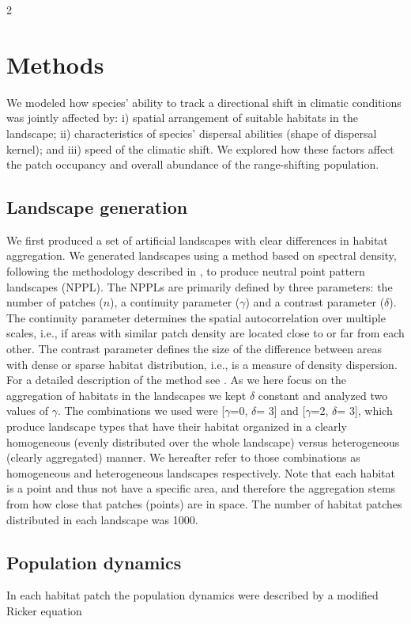 \documentclass[12pt,pdftex]{article}
\begin{document}
\begin{spacing}{2}
\section*{Methods}

We modeled how species' ability to track a directional shift in climatic conditions was jointly affected by: i) spatial arrangement of suitable habitats in the landscape; ii) characteristics of species' dispersal abilities (shape of dispersal kernel); and iii) speed of the climatic shift. We explored how these factors affect the patch occupancy and overall abundance of the range-shifting population.

\subsection*{Landscape generation}			
We first produced a set of artificial landscapes with clear differences in habitat aggregation. We generated landscapes using a method based on spectral density, following the methodology described in \cite{Lindstrom2011}, to produce neutral point pattern landscapes (NPPL). The NPPLs are primarily defined by three parameters: the number of patches ($n$), a continuity parameter ($\gamma$) and a contrast parameter ($\delta$). The continuity parameter determines the spatial autocorrelation over multiple scales, i.e., if areas with similar patch density are located close to or far from each other. The contrast parameter defines the size of the difference between areas with dense or sparse habitat distribution, i.e., is a measure of density dispersion. For a detailed description of the method see \cite{Lindstrom2011}. As we here focus on the aggregation of habitats in the landscapes we kept  $\delta$ constant and analyzed two values of $\gamma$. The combinations we used were [$\gamma$=0, $\delta$= 3] and [$\gamma$=2, $\delta$= 3], which produce landscape types that have their habitat organized in a clearly homogeneous (evenly distributed over the whole landscape) versus heterogeneous (clearly aggregated) manner. We hereafter refer to those combinations as homogeneous and heterogeneous landscapes respectively. Note that each habitat is a point and thus not have a specific area, and therefore the aggregation stems from how close that patches (points) are in space. The number of habitat patches distributed in each landscape was 1000.

\subsection*{Population dynamics}
In each habitat patch the population dynamics were described by a modified Ricker equation \citep{Ricker1954}


\end{spacing}
\end{document}
